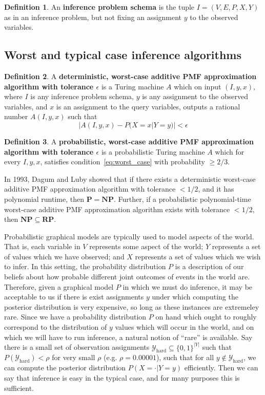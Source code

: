 \documentclass{article}
\renewcommand{\P}{\mathbf{P}}
\newcommand{\NP}{\mathbf{NP}}
\newcommand{\RP}{\mathbf{RP}}
\theoremstyle{definition}
\newtheorem{defn}{Definition}
\theoremstyle{remark}
\begin{document}
\begin{defn}
An \textbf{inference problem schema} is the tuple $I = (V, E, P, X, Y)$ as in an inference problem, but not fixing an assignment $y$ to the observed variables.
\end{defn}

\subsection{Worst and typical case inference algorithms}

\begin{defn}
A \textbf{deterministic, worst-case additive PMF approximation algorithm with tolerance $\epsilon$} is a Turing machine $A$ which on input
$(I, y, x)$, where $I$ is any inference problem schema, $y$ is any assignment to the observed variables, and $x$ is an assignment to the query variables, outputs a rational number $A(I, y, x)$ such that
\begin{equation} \label{eq:worst_case}
|A(I, y, x) - P(X = x | Y = y)| < \epsilon
\end{equation}
\end{defn}
\begin{defn}
A \textbf{probabilistic, worst-case additive PMF approximation algorithm with tolerance $\epsilon$} is a probabilistic Turing machine $A$ which for every $I, y, x$, satisfies condition~\ref{eq:worst_case} with probability $\geq 2/3$.
\end{defn}

In 1993, Dagum and Luby \cite{dagum1993} showed that if there exists a deterministic worst-case additive PMF approximation algorithm with tolerance $< 1/2$, and it has polynomial runtime, then $\P = \NP$.
Further, if a probabilistic polynomial-time worst-case additive PMF approximation algorithm exists with tolerance $< 1/2$, then $\NP \subseteq \RP$.

Probabilistic graphical models are typically used to model aspects of the world.
That is, each variable in $V$ represents some aspect of the world; $Y$ represents a set of values which we have observed; and $X$ represents a set of values which we wish to infer.
In this setting, the probability distribution $P$ is a description of our beliefs about how probable different joint outcomes of events in the world are.
Therefore, given a graphical model $P$ in which we must do inference, it may be acceptable to us if there is exist assignments $y$ under which computing the posterior distribution is very expensive, so long as these instances are extremeley rare.
Since we have a probability distribution $P$ on hand which ought to roughly correspond to the distribution of $y$ values which will occur in the world, and on which we will have to run inference, a natural notion of ``rare'' is available.
Say there is a small set of observation assignments $\mathcal{Y}_\text{hard} \subseteq \{0, 1\}^{|Y|}$ such that $P(\mathcal{Y}_\text{hard}) < \rho$ for very small $\rho$ (e.g. $\rho = 0.00001$), such that for all $y \notin \mathcal{Y}_\text{hard}$, we can compute the posterior distribution $P(X = \cdot | Y = y)$ efficiently.
Then we can say that inference is easy in the typical case, and for many purposes this is sufficient.
\end{document}
